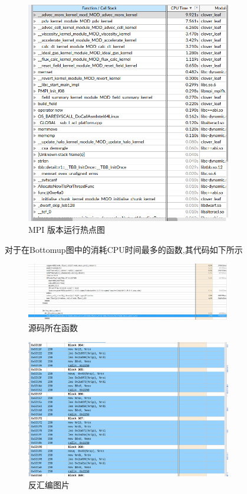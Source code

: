 \documentclass{article}
\begin{document}
\begin{CJK}{UTF8}{gbsn}
\begin{figure}[H]
    \includegraphics[width=0.8\textwidth]{./call4.png}
    \caption{MPI 版本运行热点图}
\end{figure}
对于在Bottomup图中的消耗CPU时间最多的函数,其代码如下所示\\
\begin{figure}[H]
    \centering
    \includegraphics[width=0.8\textwidth]{./call5.png}
    \caption{源码所在函数}
\end{figure}
\begin{figure}[H]
    \centering
    \includegraphics[width=0.8\textwidth]{./call6.png}
    \caption{反汇编图片}
\end{figure}


\end{CJK}
\end{document}
